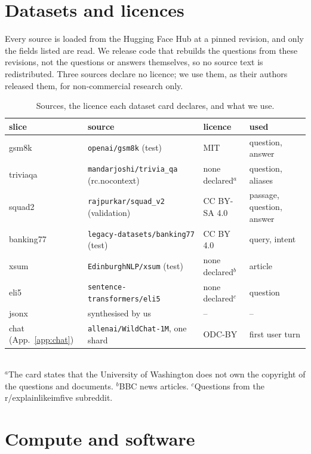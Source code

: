 \documentclass[11pt]{article}
\begin{document}
\section{Datasets and licences}
\label{app:data}
Every source is loaded from the Hugging Face Hub at a pinned revision, and only
the fields listed are read. We release code that rebuilds the questions from these
revisions, not the questions or answers themselves, so no source text is
redistributed. Three sources declare no licence; we use them, as their authors
released them, for non-commercial research only.

\begin{table}[h]
  \centering\small
  \caption{Sources, the licence each dataset card declares, and what we use.}
  \label{tab:data}
  \begin{tabular}{llll}
    \toprule
    slice & source & licence & used \\
    \midrule
    \textsf{gsm8k} & \texttt{openai/gsm8k} (test) & MIT & question, answer \\
    \textsf{triviaqa} & \texttt{mandarjoshi/trivia\_qa} (rc.nocontext) & none declared$^a$ & question, aliases \\
    \textsf{squad2} & \texttt{rajpurkar/squad\_v2} (validation) & CC BY-SA 4.0 & passage, question, answer \\
    \textsf{banking77} & \texttt{legacy-datasets/banking77} (test) & CC BY 4.0 & query, intent \\
    \textsf{xsum} & \texttt{EdinburghNLP/xsum} (test) & none declared$^b$ & article \\
    \textsf{eli5} & \texttt{sentence-transformers/eli5} & none declared$^c$ & question \\
    \textsf{jsonx} & synthesised by us & -- & -- \\
    chat (App.~\ref{app:chat}) & \texttt{allenai/WildChat-1M}, one shard & ODC-BY & first user turn \\
    \bottomrule
  \end{tabular}\\[2pt]
  {\footnotesize $^a$The card states that the University of Washington does not own
  the copyright of the questions and documents. $^b$BBC news articles.
  $^c$Questions from the r/explainlikeimfive subreddit.}
\end{table}

\section{Compute and software}
\label{app:compute}
\end{document}
